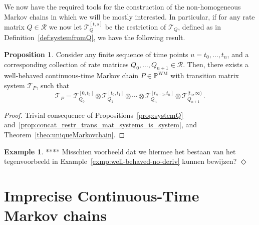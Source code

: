 \documentclass[10pt]{paper}
\theoremstyle{definition}
\newtheorem{exmp}{Example}%
\newtheorem{proposition}[theorem]{Proposition}
\newcommand{\reals}{\mathbb{R}}
\newcommand{\realsnonneg}{\reals_{\geq 0}}
\newcommand{\processes}{\mathbb{P}}
\newcommand{\wmprocesses}{\processes^{\mathrm{WM}}}
\newcommand{\exampleend}{\hfill$\Diamond$}
\begin{document}
We now have the required tools for the construction of the non-homogeneous Markov chains in which we will be mostly interested. In particular, if for any rate matrix $Q\in\mathcal{R}$ we now let $\mathcal{T}_Q^{[t,s]}$ be the restriction of $\mathcal{T}_Q$, defined as in Definition~\ref{def:systemfromQ}, we have the following result.

\begin{proposition}\label{prop:continuous_rate_matrix_has_process}
Consider any finite sequence of time points $u=t_0,\ldots,t_n$, and a corresponding collection of rate matrices $Q_0,\ldots,Q_{n+1}\in\mathcal{R}$. Then, there exists a well-behaved continuous-time Markov chain $P\in\wmprocesses$ with transition matrix system $\mathcal{T}_P$, such that
\begin{equation*}
\mathcal{T}_P = \mathcal{T}_{Q_0}^{[0,t_0]}\otimes \mathcal{T}_{Q_1}^{[t_0,t_1]} \otimes \cdots \otimes \mathcal{T}_{Q_n}^{[t_{n-1},t_n]} \otimes \mathcal{T}_{Q_{n+1}}^{[t_n,\infty)}\,.
\end{equation*}
\end{proposition}
\begin{proof}
Trivial consequence of Propositions~\ref{prop:systemQ} and~\ref{prop:concat_restr_trans_mat_systems_is_system}, and Theorem~\ref{theo:uniqueMarkovchain}.
\end{proof}

\begin{exmp}
**** Misschien voorbeeld dat we hiermee het bestaan van het tegenvoorbeeld in Example~\ref{exmp:well-behaved-no-deriv} kunnen bewijzen?
\exampleend
\end{exmp}



\section{Imprecise Continuous-Time Markov chains}
\label{sec:iCTMC}
\end{document}
